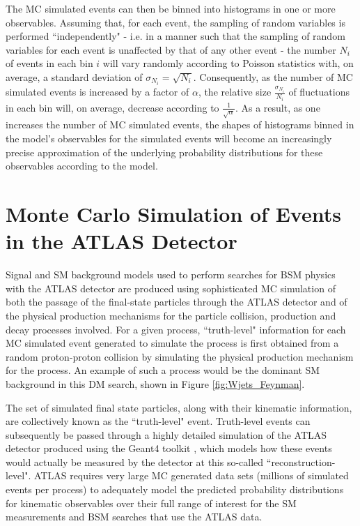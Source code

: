 The MC simulated events can then be binned into histograms in one or more observables. Assuming that, for each event, the sampling of random variables is performed ``independently" - i.e. in a manner such that the sampling of random variables for each event is unaffected by that of any other event - the number $N_i$ of events in each bin $i$ will vary randomly according to Poisson statistics with, on average, a standard deviation of $\sigma_{N_i}=\sqrt{N_i}$. Consequently, as the number of MC simulated events is increased by a factor of $\alpha$, the relative size $\frac{\sigma_{N_i}}{N_i}$ of fluctuations in each bin will, on average, decrease according to $\frac{1}{\sqrt{\alpha}}$. As a result, as one increases the number of MC simulated events, the shapes of histograms binned in the model's observables for the simulated events will become an increasingly precise approximation of the underlying probability distributions for these observables according to the model. 

\section{Monte Carlo Simulation of Events in the ATLAS Detector}

Signal and SM background models used to perform searches for BSM physics with the ATLAS detector are produced using sophisticated MC simulation of both the passage of the final-state particles through the ATLAS detector and of the physical production mechanisms for the particle collision, production and decay processes involved. For a given process, ``truth-level" information for each MC simulated event generated to simulate the process is first obtained from a random proton-proton collision by simulating the physical production mechanism for the process. An example of such a process would be the dominant \wjets SM background in this DM search, shown in Figure \ref{fig:Wjets_Feynman}.

The set of simulated final state particles, along with their kinematic information, are collectively known as the ``truth-level" event. Truth-level events can subsequently be passed through a highly detailed  simulation of the ATLAS detector \cite{atlas_sim} produced using the Geant4 toolkit \cite{Geant4}, which models how these events would actually be measured by the detector at this so-called ``reconstruction-level". ATLAS requires very large MC generated data sets (millions of simulated events per process) to adequately model the predicted probability distributions for kinematic observables over their full range of interest for the SM measurements and BSM searches that use the ATLAS data.

